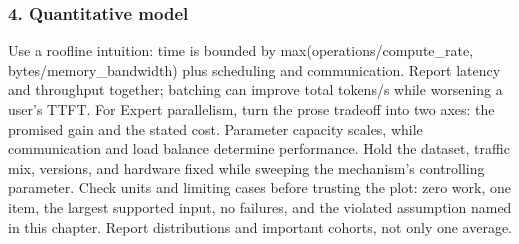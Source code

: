 \subsubsection*{4. Quantitative model}
Use a roofline intuition: time is bounded by max(operations/compute\_rate, bytes/memory\_bandwidth) plus scheduling and communication. Report latency and throughput together; batching can improve total tokens/s while worsening a user's TTFT.
For Expert parallelism, turn the prose tradeoff into two axes: the promised gain and the stated cost. Parameter capacity scales, while communication and load balance determine performance. Hold the dataset, traffic mix, versions, and hardware fixed while sweeping the mechanism's controlling parameter.
Check units and limiting cases before trusting the plot: zero work, one item, the largest supported input, no failures, and the violated assumption named in this chapter. Report distributions and important cohorts, not only one average.
